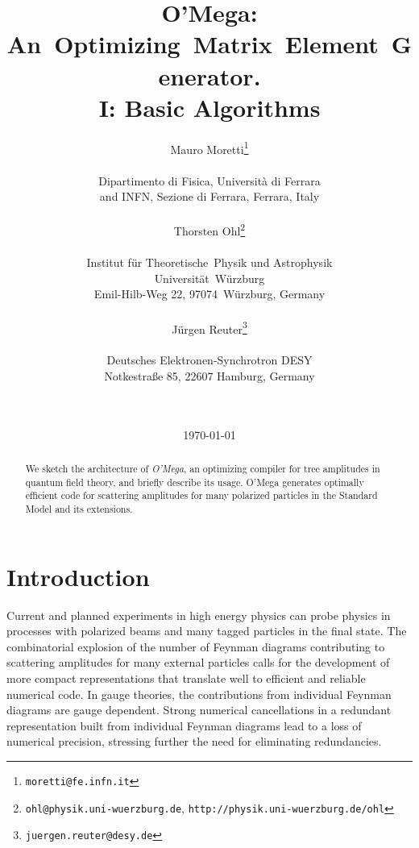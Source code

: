 \documentclass[12pt,a4paper]{article}
\begin{document}
\title{
  O'Mega: An~Optimizing~Matrix~Element~Generator.\\
  I: Basic Algorithms}
\author{%
  Mauro Moretti\thanks{\texttt{moretti@fe.infn.it}}\\
  \hfil\\
    Dipartimento di Fisica, Universit\`a di Ferrara\\
    and INFN, Sezione di Ferrara, Ferrara, Italy\\
  \hfil\\
  Thorsten Ohl\thanks{\texttt{ohl@physik.uni-wuerzburg.de},
    \texttt{http://physik.uni-wuerzburg.de/ohl}}\\
  \hfil\\
    Institut f\"ur Theoretische~Physik und Astrophysik\\
    Universit\"at~W\"urzburg\\
    Emil-Hilb-Weg 22, 97074~W\"urzburg, Germany\\
  \hfil\\
  J\"urgen Reuter\thanks{\texttt{juergen.reuter@desy.de}}\\
  \hfil\\
   Deutsches Elektronen-Synchrotron DESY\\
   Notkestra\ss{}e 85, 22607 Hamburg, Germany}
\date{%
  \\
  \hfil\\
  \today}
\maketitle
\newpage
\begin{abstract}
  We sketch the architecture of \textit{O'Mega}, an
  optimizing compiler for tree amplitudes in quantum field theory,
  and briefly describe its usage.
  O'Mega generates optimally efficient code for
  scattering amplitudes for many polarized particles in the Standard
  Model and its extensions.
\end{abstract}

\section{Introduction}
\label{sec:intro}
Current and planned experiments in high energy physics can probe
physics in
processes with polarized beams and many tagged particles in the final
state.  The combinatorial explosion of the number of Feynman diagrams
contributing to scattering amplitudes for many external particles
calls for the development of more compact representations that
translate well to efficient and reliable numerical code.  In gauge
theories, the contributions from individual Feynman diagrams are gauge
dependent.  Strong numerical cancellations in a redundant
representation built from individual Feynman diagrams lead to a loss
of numerical precision, stressing further the need for eliminating
redundancies.
\end{document}
